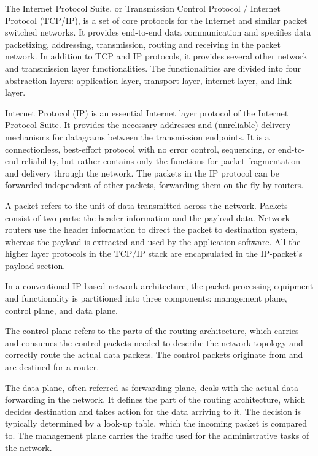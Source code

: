 The Internet Protocol Suite, or Transmission Control Protocol / Internet Protocol (TCP/IP), is a set of core protocols for the Internet and similar packet switched networks. It provides end-to-end data communication and specifies data packetizing, addressing, transmission, routing and receiving in the packet network. In addition to TCP and IP protocols, it provides several other network and transmission layer functionalities. The functionalities are divided into four abstraction layers: application layer, transport layer, internet layer, and link layer.~\cite{Braden:1989:TCPIP}

Internet Protocol (IP) is an essential Internet layer protocol of the Internet Protocol Suite. It provides the necessary addresses and (unreliable) delivery mechanisms for datagrams between the transmission endpoints. It is a connectionless, best-effort protocol with no error control, sequencing, or end-to-end reliability, but rather contains only the functions for packet fragmentation and delivery through the network. The packets in the IP protocol can be forwarded independent of other packets, forwarding them on-the-fly by routers.~\cite{Deering:1998:Internet}

A packet refers to the unit of data transmitted across the network. Packets consist of two parts: the header information and the payload data. Network routers use the header information to direct the packet to destination system, whereas the payload is extracted and used by the application software. All the higher layer protocols in the TCP/IP stack are encapsulated in the IP-packet's payload section.~\cite{Deering:1998:Internet}

In a conventional IP-based network architecture, the packet processing equipment and functionality is partitioned into three components: management plane, control plane, and data plane.~\cite{Chao:2007:HPS}

The control plane refers to the parts of the routing architecture, which carries and consumes the control packets needed to describe the network topology and correctly route the actual data packets. The control packets originate from and are destined for a router.~\cite{Chao:2007:HPS, Yang:2004:FCE}

The data plane, often referred as forwarding plane, deals with the actual data forwarding in the network. It defines the part of the routing architecture, which decides destination and takes action for the data arriving to it. The decision is typically determined by a look-up table, which the incoming packet is compared to. The management plane carries the traffic used for the administrative tasks of the network.~\cite{Chao:2007:HPS, Yang:2004:FCE}


